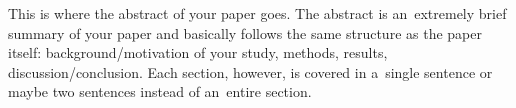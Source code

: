 %
%
%
\blindmathfalse
\noindent%
This is where the abstract of your paper goes. The abstract is an~extremely brief summary of your paper and basically follows the same structure as the paper itself: background/motivation of your study, methods, results, discussion/conclusion. Each section, however, is covered in a~single sentence or maybe two sentences instead of an~entire section. \blindtext